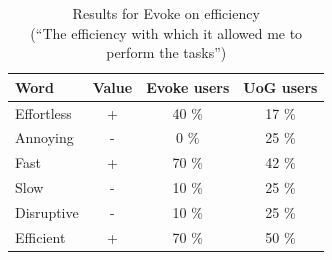 \begin{table}[htbp]
\begin{minipage}{.7\textwidth}
    \begin{tabular}{p{1in}ccc}
    \toprule
        \textbf{Word} & \textbf{Value} & \textbf{Evoke users} & \textbf{UoG users} \\ 
    \midrule
        Effortless & + & 40 \% & 17 \% \\
        Annoying & - & 0 \% & 25 \% \\
        Fast & + & 70 \% & 42 \% \\
        Slow & - & 10 \% & 25 \% \\
        Disruptive & - & 10 \% & 25 \% \\
        Efficient & + & 70 \% & 50 \% \\
    \midrule
    \end{tabular}
    \caption[]{\label{table:Stolk2021x:eval:Evoke-efficiency}Results for Evoke on efficiency\\(``The efficiency with which it allowed me to perform the tasks'')}
\end{minipage}
\begin{minipage}{.25\textwidth}
  
\end{minipage}
\end{table}


